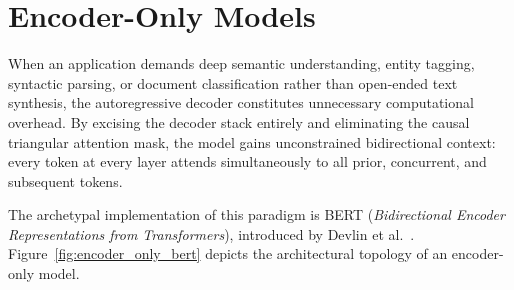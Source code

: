 \documentclass[../../../main.tex]{subfiles}
\begin{document}
\section{Encoder-Only Models}
\label{sec:encoder_only_bert}

When an application demands deep semantic understanding, entity tagging, syntactic parsing, or document classification rather than open-ended text synthesis, the autoregressive decoder constitutes unnecessary computational overhead. By excising the decoder stack entirely and eliminating the causal triangular attention mask, the model gains unconstrained bidirectional context: every token at every layer attends simultaneously to all prior, concurrent, and subsequent tokens.

The archetypal implementation of this paradigm is BERT (\emph{Bidirectional Encoder Representations from Transformers}), introduced by Devlin et al.~\cite{devlin2019}. Figure~\ref{fig:encoder_only_bert} depicts the architectural topology of an encoder-only model.
\end{document}
